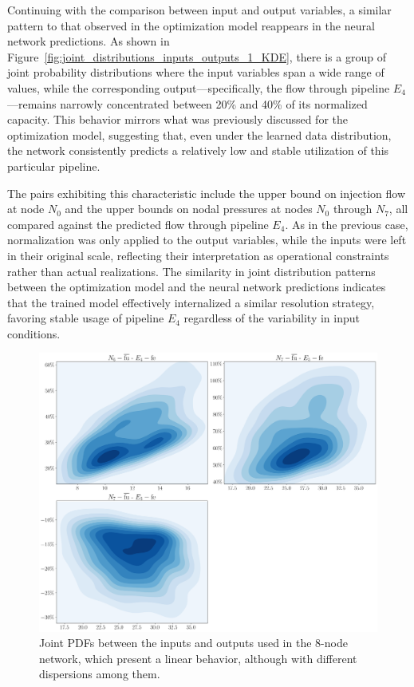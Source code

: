 Continuing with the comparison between input and output variables, a similar pattern to that observed in the optimization model reappears in the neural network predictions. As shown in Figure~\cref{fig:joint_distributions_inputs_outputs_1_KDE}, there is a group of joint probability distributions where the input variables span a wide range of values, while the corresponding output—specifically, the flow through pipeline $E_4$—remains narrowly concentrated between 20\% and 40\% of its normalized capacity. This behavior mirrors what was previously discussed for the optimization model, suggesting that, even under the learned data distribution, the network consistently predicts a relatively low and stable utilization of this particular pipeline.

The pairs exhibiting this characteristic include the upper bound on injection flow at node $N_0$ and the upper bounds on nodal pressures at nodes $N_0$ through $N_7$, all compared against the predicted flow through pipeline $E_4$. As in the previous case, normalization was only applied to the output variables, while the inputs were left in their original scale, reflecting their interpretation as operational constraints rather than actual realizations. The similarity in joint distribution patterns between the optimization model and the neural network predictions indicates that the trained model effectively internalized a similar resolution strategy, favoring stable usage of pipeline $E_4$ regardless of the variability in input conditions.


\begin{figure}
    \begin{center}
        \includegraphics[width=.7\textwidth]{figures/Chapter_NonLinealCensnet/inputs_outputs_2 KDE.png}
    \end{center}
    \caption{Joint PDFs between the inputs and outputs used in the 8-node network, which present a linear behavior, although with different dispersions among them. }
    \label{fig:joint_distributions_inputs_outputs_2_KDE}
\end{figure}
 

